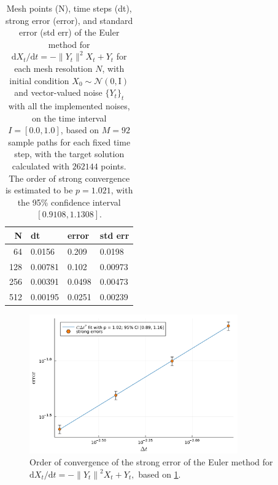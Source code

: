 \documentclass[reqno,12pt]{amsart}
\theoremstyle{plain} %
\theoremstyle{definition} %
\begin{document}
\begin{table}
    \begin{center}
        \begin{tabular}[htb]{|r|l|l|l|}
            \hline N & dt & error & std err \\
            \hline \hline
            64 & 0.0156 & 0.209 & 0.0198 \\
            128 & 0.00781 & 0.102 & 0.00973 \\
            256 & 0.00391 & 0.0498 & 0.00473 \\
            512 & 0.00195 & 0.0251 & 0.00239 \\
            \hline
        \end{tabular}
    \end{center}

    \bigskip

    \caption{Mesh points (N), time steps (dt), strong error (error), and standard error (std err) of the Euler method for $\mathrm{d}{X}_t/\mathrm{d}t = - \| {Y}_t\|^2 {X}_t + {Y}_t$ for each mesh resolution $N$, with initial condition ${X}_0 \sim \mathcal{N}({0}, \mathrm{I})$ and vector-valued noise $\{{Y}_t\}_t$ with all the implemented noises, on the time interval $I = [0.0, 1.0]$, based on $M = 92$ sample paths for each fixed time step, with the target solution calculated with $262144$ points. The order of strong convergence is estimated to be $p = 1.021$, with the 95\% confidence interval $[0.9108, 1.1308]$.}

    \label{supp:taballnoises}
\end{table}

\begin{figure}[htb]
    \centerline{\includegraphics[width=0.8\textwidth]{img/order_allnoises.pdf}}
    \caption{Order of convergence of the strong error of the Euler method for $\mathrm{d}{X}_t/\mathrm{d}t = - \left\|{Y}_t\right\|^2 {X}_t + {Y}_t,$ based on \cref{supp:taballnoises}.}
    \label{supp:figallnoises}
\end{figure}
\end{document}
